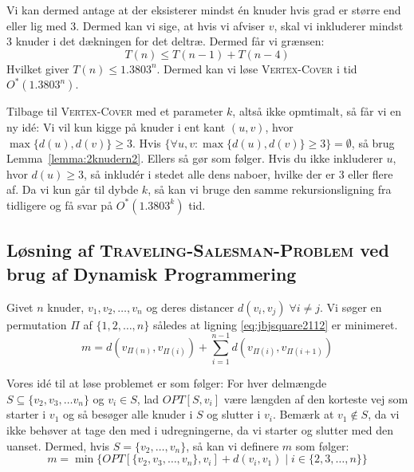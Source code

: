 Vi kan dermed antage at der eksisterer mindst én knuder hvis grad er større end eller lig med 3. Dermed kan vi sige, at hvis vi afviser $v$, skal vi inkluderer mindst 3 knuder i det dækningen for det deltræ. Dermed får vi grænsen:
\begin{equation*}
	T(n) \le T(n-1) + T(n-4)
\end{equation*}
Hvilket giver $T(n) \le 1.3803^{n}$. Dermed kan vi løse \textsc{Vertex-Cover} i tid $O^{*}(1.3803^{n})$.

Tilbage til \textsc{Vertex-Cover} med et parameter $k$, altså ikke opmtimalt, så får vi en ny idé: Vi vil kun kigge på knuder i ent kant $(u,v)$, hvor $\max\{d(u), d(v)\} \ge 3$. Hvis $\{\forall u,v : \max\{d(u),d(v)\} \ge 3\} = \emptyset$, så brug Lemma~\ref{lemma:2knudern2}. Ellers så gør som følger. Hvis du ikke inkluderer $u$, hvor $d(u) \ge 3$, så inkludér i stedet alle dens naboer, hvilke der er 3 eller flere af. Da vi kun går til dybde $k$, så kan vi bruge den samme rekursionsligning fra tidligere og få svar på $O^{*}(1.3803^{k})$ tid.

\subsection{Løsning af \textsc{Traveling-Salesman-Problem} ved brug af Dynamisk Programmering}%
\label{subsec:label}

Givet $n$ knuder, $v_{1}, v_{2}, \ldots, v_{n}$ og deres distancer $d(v_{i}, v_{j}) \; \forall i \ne j$. Vi søger en permutation \(\Pi\) af $\{1,2, \ldots, n\}$ således at ligning \ref{eq:jbjsquare2112} er minimeret.
\begin{equation}
	\label{eq:jbjsquare2112}
	m = d(v_{\Pi(n)}, v_{\Pi(i)}) + \sum_{i=1}^{n-1}  d(v_{\Pi(i)}, v_{\Pi(i+1)})
\end{equation}

Vores idé til at løse problemet er som følger: For hver delmængde $S \subseteq \{v_{2}, v_{3}, \ldots v_{n}\}$ og $v_{i} \in S$, lad $OPT[S, v_{i}]$ være længden af den korteste vej som starter i $v_{1}$ og så besøger alle knuder i $S$ og slutter i $v_{i}$. Bemærk at $v_{1} \notin S$, da vi ikke behøver at tage den med i udregningerne, da vi starter og slutter med den uanset. Dermed, hvis $S = \{v_{2}, \ldots, v_{n}\}$, så kan vi definere $m$ som følger:
\begin{equation*}
	m = \min\{OPT[\{v_{2}, v_{3}, \ldots, v_{n}\}, v_{i}] + d(v_{i}, v_{1}) \mid i \in \{2, 3, \ldots, n\}\}
\end{equation*}


